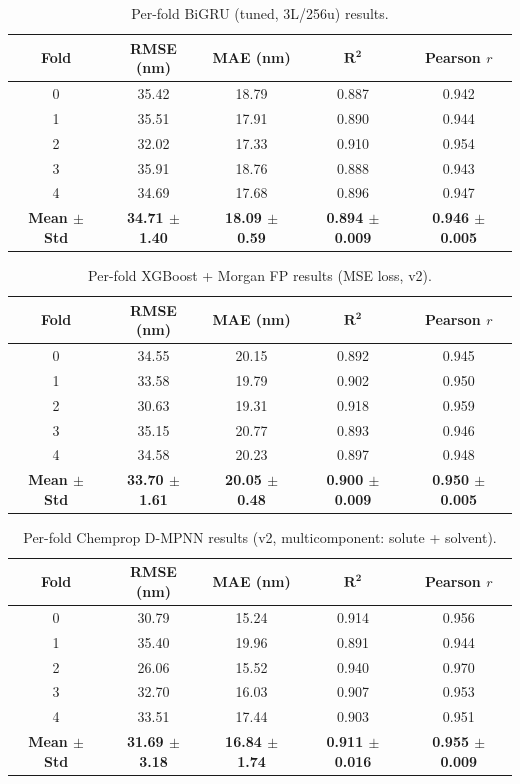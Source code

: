 \documentclass[journal=jcisd8,manuscript=suppinfo]{achemso}
\begin{document}
\begin{table}[htbp]
\centering
\caption{Per-fold BiGRU (tuned, 3L/256u) results.}
\label{tab:perfold_bigru_tuned}
\begin{tabular}{ccccc}
\toprule
\textbf{Fold} & \textbf{RMSE (nm)} & \textbf{MAE (nm)} & $\boldsymbol{R^2}$ & \textbf{Pearson $r$} \\
\midrule
0 & 35.42 & 18.79 & 0.887 & 0.942 \\
1 & 35.51 & 17.91 & 0.890 & 0.944 \\
2 & 32.02 & 17.33 & 0.910 & 0.954 \\
3 & 35.91 & 18.76 & 0.888 & 0.943 \\
4 & 34.69 & 17.68 & 0.896 & 0.947 \\
\midrule
\textbf{Mean $\pm$ Std} & \textbf{34.71 $\pm$ 1.40} & \textbf{18.09 $\pm$ 0.59} & \textbf{0.894 $\pm$ 0.009} & \textbf{0.946 $\pm$ 0.005} \\
\bottomrule
\end{tabular}
\end{table}

\begin{table}[htbp]
\centering
\caption{Per-fold XGBoost + Morgan FP results (MSE loss, v2).}
\label{tab:perfold_xgboost}
\begin{tabular}{ccccc}
\toprule
\textbf{Fold} & \textbf{RMSE (nm)} & \textbf{MAE (nm)} & $\boldsymbol{R^2}$ & \textbf{Pearson $r$} \\
\midrule
0 & 34.55 & 20.15 & 0.892 & 0.945 \\
1 & 33.58 & 19.79 & 0.902 & 0.950 \\
2 & 30.63 & 19.31 & 0.918 & 0.959 \\
3 & 35.15 & 20.77 & 0.893 & 0.946 \\
4 & 34.58 & 20.23 & 0.897 & 0.948 \\
\midrule
\textbf{Mean $\pm$ Std} & \textbf{33.70 $\pm$ 1.61} & \textbf{20.05 $\pm$ 0.48} & \textbf{0.900 $\pm$ 0.009} & \textbf{0.950 $\pm$ 0.005} \\
\bottomrule
\end{tabular}
\end{table}

\begin{table}[htbp]
\centering
\caption{Per-fold Chemprop D-MPNN results (v2, multicomponent: solute + solvent).}
\label{tab:perfold_chemprop}
\begin{tabular}{ccccc}
\toprule
\textbf{Fold} & \textbf{RMSE (nm)} & \textbf{MAE (nm)} & $\boldsymbol{R^2}$ & \textbf{Pearson $r$} \\
\midrule
0 & 30.79 & 15.24 & 0.914 & 0.956 \\
1 & 35.40 & 19.96 & 0.891 & 0.944 \\
2 & 26.06 & 15.52 & 0.940 & 0.970 \\
3 & 32.70 & 16.03 & 0.907 & 0.953 \\
4 & 33.51 & 17.44 & 0.903 & 0.951 \\
\midrule
\textbf{Mean $\pm$ Std} & \textbf{31.69 $\pm$ 3.18} & \textbf{16.84 $\pm$ 1.74} & \textbf{0.911 $\pm$ 0.016} & \textbf{0.955 $\pm$ 0.009} \\
\bottomrule
\end{tabular}
\end{table}
\end{document}

